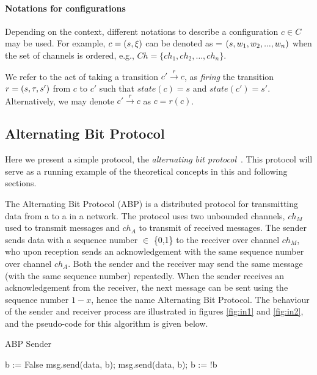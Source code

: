 \paragraph{Notations for configurations}
Depending on the context, different notations to describe a configuration $c\in C$ may be used. For example, $c = (s, \xi)$ can be denoted as  = $(s, w_1, w_2, ..., w_n)$ when the set of channels is ordered, e.g., $Ch=\{ch_1,ch_2, \ldots,ch_n\}$.

We refer to the act of taking a transition $c' \xrightarrow{r} c$, as \emph{firing} the transition $r=(s,\tau,s')$ from $c$ to $c'$ such that $state(c)=s$ and $state(c')=s'$. Alternatively, we may denote $c' \xrightarrow{r} c$ as $c = r(c)$.

\subsection{Alternating Bit Protocol}
Here we present a simple protocol, the \emph{alternating bit protocol}~\cite{bartlett1969note}. This protocol will serve as a running example of the theoretical concepts in this and following sections.

The Alternating Bit Protocol (ABP)\cite{foldoc} is a distributed protocol for transmitting data from a  to a  in a network. The protocol uses two unbounded channels, $ch_M$ used to transmit messages and $ch_A$ to transmit  of received messages. The sender sends data with a sequence number  $\in$ \{0,1\} to the receiver over channel $ch_M$, who upon reception sends an acknowledgement with the same sequence number over channel $ch_A$. Both the sender and the receiver may send the same message (with the same sequence number) repeatedly. When the sender receives an acknowledgement from the receiver, the next message can be sent using the sequence number $1-x$, hence the name Alternating Bit Protocol. The behaviour of the sender and receiver process are illustrated in figures \ref{fig:in1} and \ref{fig:in2}, and the pseudo-code for this algorithm is given below.

\begin{algorithm}
  \caption{ABP Sender}
  \label{senderpseudo}
\begin{algorithmic}[1]
    \State b := False 
      \State msg.send(data, b); 
       
      \State msg.send(data, b); 
      \EndWhile
      \State b := !b 
    \EndFor
\end{algorithmic}
\end{algorithm}


